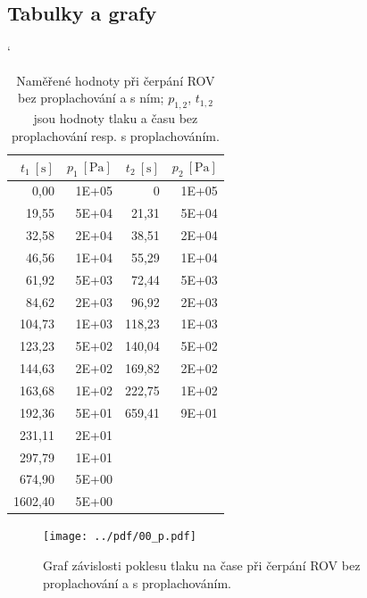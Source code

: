 \documentclass[english]{article}
\newcommand{\unit}[1]{\mathrm{#1}}
\begin{document}
\clearpage
\subsection{Tabulky a grafy}
	
\begin{table}[h!]
\catcode` %
	\centering
	\begin{tabular}{|r|r|r|r|}
		\hline
		$t_1~\unit{[s]}$ & $p_1~\unit{[Pa]}$ & $t_2~\unit{[s]}$ & $p_2~\unit{[Pa]}$ \bigstrut\\
		\hline
		0,00  & 1E+05 & 0     & 1E+05 \bigstrut\\
		\hline
		19,55 & 5E+04 & 21,31 & 5E+04 \bigstrut\\
		\hline
		32,58 & 2E+04 & 38,51 & 2E+04 \bigstrut\\
		\hline
		46,56 & 1E+04 & 55,29 & 1E+04 \bigstrut\\
		\hline
		61,92 & 5E+03 & 72,44 & 5E+03 \bigstrut\\
		\hline
		84,62 & 2E+03 & 96,92 & 2E+03 \bigstrut\\
		\hline
		104,73 & 1E+03 & 118,23 & 1E+03 \bigstrut\\
		\hline
		123,23 & 5E+02 & 140,04 & 5E+02 \bigstrut\\
		\hline
		144,63 & 2E+02 & 169,82 & 2E+02 \bigstrut\\
		\hline
		163,68 & 1E+02 & 222,75 & 1E+02 \bigstrut\\
		\hline
		192,36 & 5E+01 & 659,41 & 9E+01 \bigstrut\\
		\hline
		231,11 & 2E+01 & \multicolumn{1}{r}{} & \multicolumn{1}{r}{} \bigstrut\\
		\cline{1-2}    297,79 & 1E+01 & \multicolumn{1}{r}{} & \multicolumn{1}{r}{} \bigstrut\\
		\cline{1-2}    674,90 & 5E+00 & \multicolumn{1}{r}{} & \multicolumn{1}{r}{} \bigstrut\\
		\cline{1-2}    1602,40 & 5E+00 & \multicolumn{1}{r}{} & \multicolumn{1}{r}{} \bigstrut\\
		\cline{1-2}    \end{tabular}%
	
	\caption{Naměřené hodnoty při čerpání ROV bez proplachování a s ním; $p_{1,2}$, $t_{1,2}$ jsou hodnoty tlaku a času bez proplachování resp. s proplachováním.}
	\label{tlak1}
	
\end{table}

\begin{figure}[h!]
	\begin{center}
		\vspace*{-1cm}
		\texttt{[image: ../pdf/00\_p.pdf]}
		\vspace*{-0,7cm}
		\caption{Graf závislosti poklesu tlaku na čase při čerpání ROV bez proplachování a s proplachováním.}
		\label{p}
	\end{center}
\end{figure}
\end{document}
